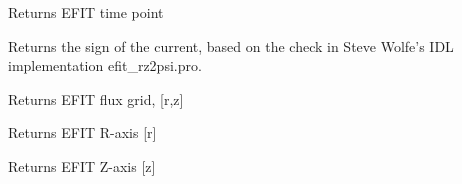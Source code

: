 \documentclass[letterpaper,10pt,english]{sphinxmanual}
\begin{document}
\begin{fulllineitems}
\begin{fulllineitems}
\end{fulllineitems}


\begin{fulllineitems}
\label{eqtools:eqtools.eqdskreader.EqdskReader.getTimeBase}
Returns EFIT time point

\end{fulllineitems}


\begin{fulllineitems}
\label{eqtools:eqtools.eqdskreader.EqdskReader.getCurrentSign}
Returns the sign of the current, based on the check in Steve Wolfe's
IDL implementation efit\_rz2psi.pro.

\end{fulllineitems}


\begin{fulllineitems}
\label{eqtools:eqtools.eqdskreader.EqdskReader.getFluxGrid}
Returns EFIT flux grid, {[}r,z{]}

\end{fulllineitems}


\begin{fulllineitems}
\label{eqtools:eqtools.eqdskreader.EqdskReader.getRGrid}
Returns EFIT R-axis {[}r{]}

\end{fulllineitems}


\begin{fulllineitems}
\label{eqtools:eqtools.eqdskreader.EqdskReader.getZGrid}
Returns EFIT Z-axis {[}z{]}

\end{fulllineitems}



\end{fulllineitems}
\end{document}
